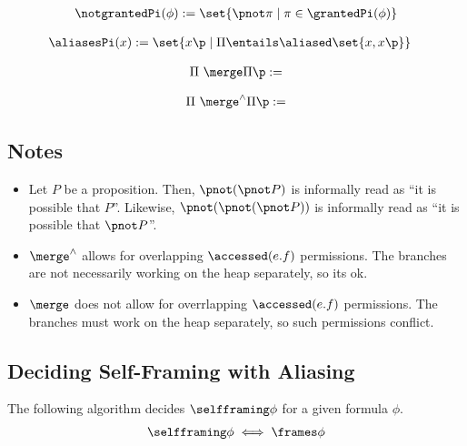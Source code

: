 \begin{align*}
\notgrantedPi(\phi) := \set{ \pnot \pi \mid \pi \in \grantedPi(\phi) }
\end{align*}

\begin{align*}
\aliasesPi(x) &:= \set{ x\p \mid \Pi \entails \aliased\set{x, x\p} }
\end{align*}



\begin{align*}
\Pi \ \merge \Pi\p := %
\end{align*}


\begin{align*}
\Pi \ \merge^\land \Pi\p := %
\end{align*}

\subsection{Notes}

\begin{itemize}
  \item
  Let $P$ be a proposition.
  Then, $\pnot (\pnot P)$ is informally read as ``it is possible that $P$''.
  Likewise, $\pnot (\pnot (\pnot P))$ is informally read as ``it is possible that $\pnot P$''.

  \item $\merge^\land$ allows for overlapping $\accessed(e.f)$ permissions. The branches are not necessarily working on the heap separately, so its ok.

  \item $\merge$ does not allow for overrlapping $\accessed(e.f)$ permissions. The branches must work on the heap separately, so such permissions conflict.
\end{itemize}

\subsection{Deciding Self-Framing with Aliasing}

\noindent
The following algorithm decides $\selfframing \phi$ for a given formula $\phi$.
\begin{align*}
\selfframing \phi \iff \empty \frames \phi
\end{align*}
